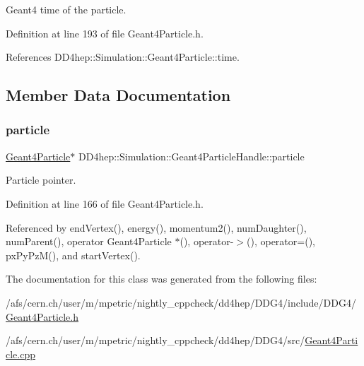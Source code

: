 Geant4 time of the particle. 



Definition at line 193 of file Geant4\+Particle.\+h.



References D\+D4hep\+::\+Simulation\+::\+Geant4\+Particle\+::time.



\subsection{Member Data Documentation}
\hypertarget{class_d_d4hep_1_1_simulation_1_1_geant4_particle_handle_ad7a732832f8fe7f74c8fdb4cff5baced}{}\label{class_d_d4hep_1_1_simulation_1_1_geant4_particle_handle_ad7a732832f8fe7f74c8fdb4cff5baced} 
\subsubsection{\texorpdfstring{particle}{particle}}
{\footnotesize\ttfamily \hyperlink{class_d_d4hep_1_1_simulation_1_1_geant4_particle}{Geant4\+Particle}$\ast$ D\+D4hep\+::\+Simulation\+::\+Geant4\+Particle\+Handle\+::particle\hspace{0.3cm}{\ttfamily [protected]}}



Particle pointer. 



Definition at line 166 of file Geant4\+Particle.\+h.



Referenced by end\+Vertex(), energy(), momentum2(), num\+Daughter(), num\+Parent(), operator Geant4\+Particle $\ast$(), operator-\/$>$(), operator=(), px\+Py\+Pz\+M(), and start\+Vertex().



The documentation for this class was generated from the following files\+:\begin{DoxyCompactItemize}
\item 
/afs/cern.\+ch/user/m/mpetric/nightly\+\_\+cppcheck/dd4hep/\+D\+D\+G4/include/\+D\+D\+G4/\hyperlink{_geant4_particle_8h}{Geant4\+Particle.\+h}\item 
/afs/cern.\+ch/user/m/mpetric/nightly\+\_\+cppcheck/dd4hep/\+D\+D\+G4/src/\hyperlink{_geant4_particle_8cpp}{Geant4\+Particle.\+cpp}\end{DoxyCompactItemize}
